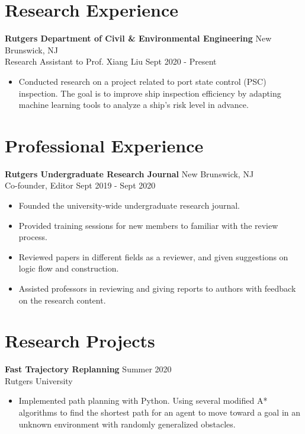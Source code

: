 \documentclass{article}
\begin{document}
\section{Research Experience}
\textbf{Rutgers Department of Civil \& Environmental Engineering}
\hfill{New Brunswick, NJ}\\
Research Assistant to Prof. Xiang Liu
\hfill{Sept 2020 - Present}
\begin{itemize}
  \itemsep0em
  \item Conducted research on a project related to port state control (PSC) inspection.  The goal is to improve ship inspection efficiency by adapting machine learning tools to analyze a ship's risk level in advance. 
  
\end{itemize}



\section{Professional Experience}
\textbf{Rutgers Undergraduate Research Journal}
\hfill{New Brunswick, NJ}\\
Co-founder, Editor
\hfill{Sept 2019 - Sept 2020}
\begin{itemize}
  \itemsep0em
  \item Founded the university-wide undergraduate research journal.
  \item Provided training sessions for new members to familiar with the review process.
  \item Reviewed papers in different fields as a reviewer, and given suggestions on logic flow and construction.
  \item Assisted professors in reviewing and giving reports to authors with feedback on the research content.
\end{itemize}


\section{Research Projects}
\textbf{Fast Trajectory Replanning}
\hfill{Summer 2020}\\
Rutgers University
\begin{itemize}
  \itemsep0em
  \item Implemented path planning with Python. Using several modified A* algorithms to find the shortest path for an agent to move toward a goal in an unknown environment with randomly generalized obstacles.
\end{itemize}
\end{document}
